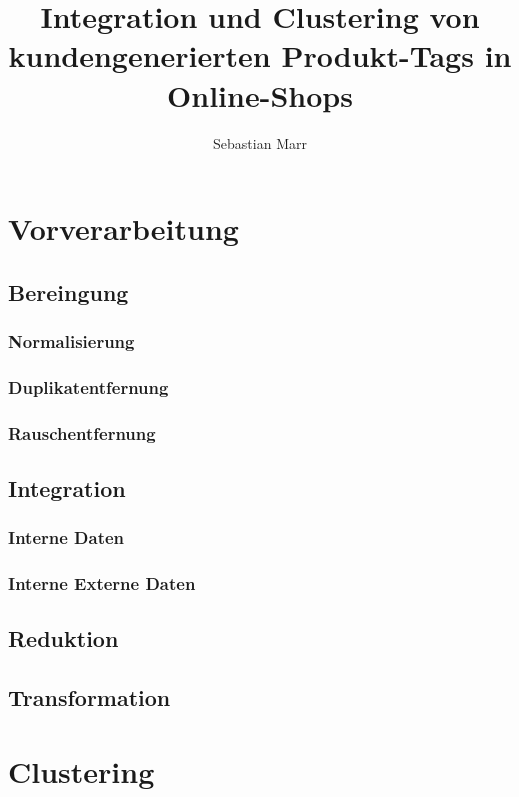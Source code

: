 \documentclass[a4paper,listof=totoc,abstracton]{scrreprt}
\author{Sebastian Marr}
\title{Integration und Clustering von kundengenerierten Produkt-Tags in Online-Shops}
\begin{document}
\maketitle

\renewcommand\abstractname{Zusammenfassung}


\tableofcontents



\chapter{Vorverarbeitung}

\section{Bereingung}
\subsection{Normalisierung}
\subsection{Duplikatentfernung}
\subsection{Rauschentfernung}

\section{Integration}
\subsection{Interne Daten}
\subsection{Interne Externe Daten}

\section{Reduktion}

\section{Transformation}

\chapter{Clustering}
\end{document}
